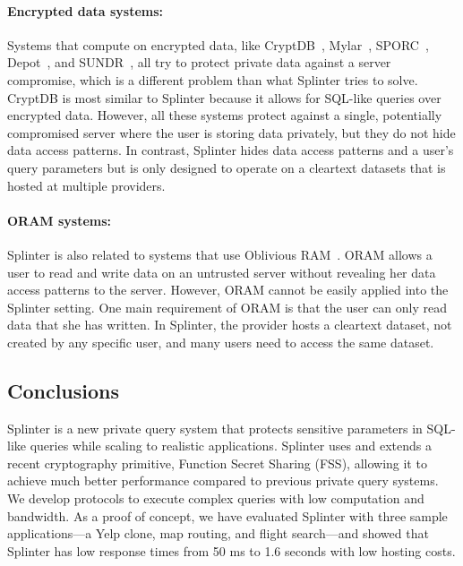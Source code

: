 \paragraph{Encrypted data systems:}
Systems that compute on encrypted data, like 
CryptDB~\cite{popa:cryptdb}, Mylar~\cite{popa:mylar}, SPORC~\cite{feldman:sporc},
Depot~\cite{mahajan:depot}, and SUNDR~\cite{li:sundr}, all try to protect
private data against a server compromise, which is a different
problem than what Splinter tries to solve. CryptDB is most similar to Splinter 
because it allows for SQL-like queries over encrypted data. However, all
these systems protect against a single, potentially compromised server 
where the user is storing data privately, but they do not hide data access patterns. 
In contrast, Splinter hides data access patterns and a user's query parameters 
but is only designed to operate on a cleartext 
datasets that is hosted at multiple providers.


\paragraph{ORAM systems:}
Splinter is also related to systems that use Oblivious RAM~\cite{stefanov:path-oram, lorch2013shroud}. 
ORAM allows a user to read and write data on an untrusted server without
revealing her data access patterns to the server. However, ORAM cannot be easily applied
into the Splinter setting. One main requirement of ORAM is that the user
can only read data that she has written. 
In Splinter, the provider hosts a cleartext dataset, not created by any specific user, 
and many users need to access the same dataset.

\subsection{Conclusions}
\label{spl-sec:conclusion}
Splinter is a new private query system that protects sensitive parameters
in SQL-like queries while scaling to realistic applications. Splinter uses and extends a recent
cryptography primitive, Function Secret Sharing (FSS),
allowing it to achieve much better
performance compared to previous private query systems. We develop
protocols to execute complex queries
with low computation and bandwidth. As a proof of concept,
we have evaluated Splinter with three sample applications---a Yelp clone,
map routing, and flight search---and showed
that Splinter has low response times from 50 ms to 1.6 seconds with low
hosting costs.
